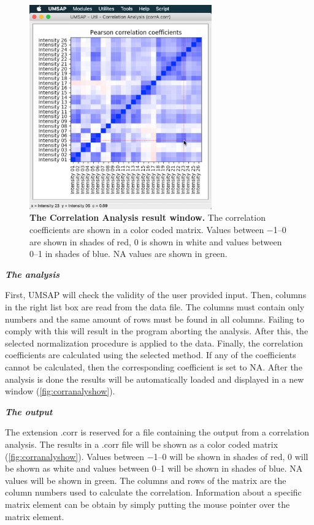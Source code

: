 \begin{figure}[h]
	\centering
	\includegraphics[width=0.7\textwidth]{./IMAGES/UTIL-CORR-WINDOW/util-corr-res.jpg}	    
	\caption[The Correlation Analysis result window]{\textbf{The Correlation Analysis result window.} The correlation coefficients are shown in a color coded matrix. Values between \numrange{-1}{0} are shown in shades of red, \num{0} is shown in white and values between \numrange{0}{1} in shades of blue. NA values are shown in green.}
	\label{fig:corranalyshow}
	\vspace{-5pt} 	
\end{figure} 

\textit{\textbf{The analysis}}

First, UMSAP will check the validity of the user provided input. Then, columns in the right list box are read from the data file. The columns must contain only numbers and the same amount of rows must be found in all columns. Failing to comply with this will result in the program aborting the analysis. After this, the selected normalization procedure is applied to the data. Finally, the correlation coefficients are calculated using the selected method. If any of the coefficients cannot be calculated, then the corresponding coefficient is set to NA. After the analysis is done the results will be automatically loaded and displayed in a new window (\autoref{fig:corranalyshow}). 

\textit{\textbf{The output}}

The extension .corr is reserved for a file containing the output from a correlation analysis. The results in a .corr file will be shown as a color coded matrix (\autoref{fig:corranalyshow}). Values between \numrange{-1}{0} will be shown in shades of red, \num{0} will be shown as white and values between \numrange{0}{1} will be shown in shades of blue. NA values will be shown in green. The columns and rows of the matrix are the column numbers used to calculate the correlation. Information about a specific matrix element can be obtain by simply putting the mouse pointer over the matrix element.  

